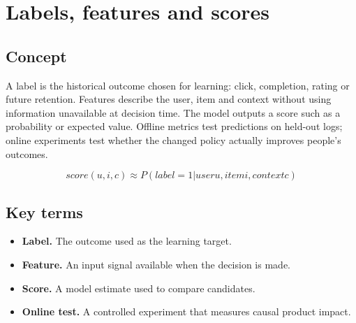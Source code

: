 \section{Labels, features and scores}

\begin{abstract}
The model learns a target from the past; its score is an estimate, not a fact.
\end{abstract}

\subsection{Concept}
A label is the historical outcome chosen for learning: click, completion, rating or future retention. Features describe the user, item and context without using information unavailable at decision time. The model outputs a score such as a probability or expected value. Offline metrics test predictions on held-out logs; online experiments test whether the changed policy actually improves people’s outcomes.

\begin{equation*}
score(u, i, c) \approx P(label = 1 | user u, item i, context c)
\end{equation*}

\subsection{Key terms}
\begin{itemize}
\item \textbf{Label.} The outcome used as the learning target.
\item \textbf{Feature.} An input signal available when the decision is made.
\item \textbf{Score.} A model estimate used to compare candidates.
\item \textbf{Online test.} A controlled experiment that measures causal product impact.
\end{itemize}
